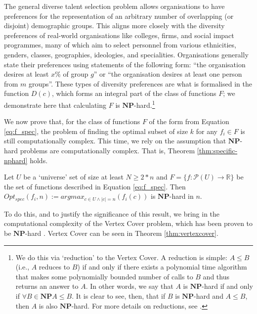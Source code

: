 The general diverse talent selection problem allows organisations to have preferences for the representation of an arbitrary number of overlapping (or disjoint) demographic groups. This aligns more closely with the diversity preferences of real-world organisations like colleges, firms, and social impact programmes, many of which aim to select personnel from various ethnicities, genders, classes, geographies, ideologies, and specialities. Organisations generally state their preferences using statements of the following form: ``the organisation desires at least $x\%$ of group $g$'' or ``the organisation desires at least one person from $m$ groups''. These types of diversity preferences are what is formalised in the function $D(c)$, which forms an integral part of the class of functions $F$; we demonstrate here that calculating $F$ is $\mathbf{NP}$-hard.\footnote{We do this via `reduction' to the Vertex Cover. A reduction is simple: $A \leq B$ (i.e., $A$ reduces to $B$) if and only if there exists a polynomial time algorithm that makes some polynomially bounded number of calls to $B$ and thus returns an answer to $A$. In other words, we say that $A$ is $\mathbf{NP}$-hard if and only if $\forall B \in \mathbf{NP} A \leq B$. It is clear to see, then, that if $B$ is $\mathbf{NP}$-hard and $A \leq B$, then $A$ is also $\mathbf{NP}$-hard. For more details on reductions, see \textcite{10.5555/1074100.1074233}.}

We now prove that, for the class of functions $F$ of the form from Equation \ref{eq:f_spec}, the problem of finding the optimal subset of size $k$ for any $f_i \in F$ is still computationally complex. This time, we rely on the assumption that $\mathbf{NP}$-hard problems are computationally complex. That is, Theorem \ref{thm:specific-nphard} holds. 

\begin{theorem}\label{thm:specific-nphard}
    Let $U$ be a `universe' set of size at least $N \geq 2*n$ and $F = \{f: \mathcal{P} (U) \rightarrow \mathbb{R}\}$ be the set of functions described in Equation \ref{eq:f_spec}. Then $Opt_{spec}(f_i, n) := argmax_{c \in U \land |c| = n}(f_i(c))$ is $\mathbf{NP}$-hard in $n$.
\end{theorem}

To do this, and to justify the significance of this result, we bring in the computational complexity of the Vertex Cover problem, which has been proven to be $\mathbf{NP}$-hard \cite{COPPERSMITH198527}. Vertex Cover can be seen in Theorem \ref{thm:vertexcover}.

